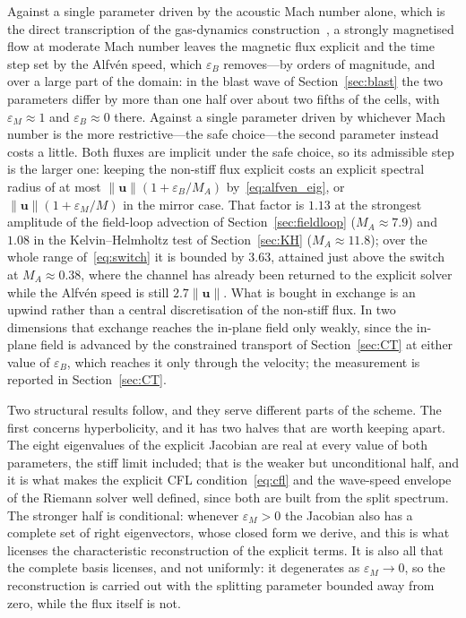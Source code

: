 \documentclass[a4paper,fleqn]{cas-sc}
\theoremstyle{remark}
\newcommand{\eps}{\varepsilon}
\newcommand{\epsM}{\eps_{M}}
\newcommand{\epsB}{\eps_{B}}
\begin{document}
Against a single parameter driven by the acoustic Mach number alone, which is
the direct transcription of the gas-dynamics
construction~\cite{DegondTang2011,IampietroEtAl2018}, a strongly magnetised
flow at moderate Mach number leaves the magnetic flux explicit and the time
step set by the Alfv\'en speed, which $\epsB$ removes---by orders of
magnitude, and over a large part of the domain: in the blast wave of
Section~\ref{sec:blast} the two parameters differ by more than one half over
about two fifths of the cells, with $\epsM\approx1$ and $\epsB\approx0$
there. Against a single parameter driven by whichever Mach number is the more
restrictive---the safe choice---the second parameter instead costs a little.
Both fluxes are implicit under the safe choice, so its admissible step is the
larger one: keeping the non-stiff flux explicit costs an explicit spectral
radius of at most $\|\mathbf u\|(1+\epsB/M_A)$ by~\eqref{eq:alfven_eig}, or
$\|\mathbf u\|(1+\epsM/M)$ in the mirror case. That factor is $1.13$ at the
strongest amplitude of the field-loop advection of Section~\ref{sec:fieldloop}
($M_A\approx7.9$) and $1.08$ in the Kelvin--Helmholtz test of
Section~\ref{sec:KH} ($M_A\approx11.8$); over the whole range
of~\eqref{eq:switch} it is bounded by $3.63$, attained just above the switch at
$M_A\approx0.38$, where the channel has already been returned to the explicit
solver while the Alfv\'en speed is still $2.7\|\mathbf u\|$. What is bought in
exchange is an upwind rather than a central discretisation of the non-stiff
flux. In two dimensions that exchange reaches the in-plane field only weakly,
since the in-plane field is advanced by the constrained transport of
Section~\ref{sec:CT} at either value of $\epsB$, which reaches it only through
the velocity; the measurement is reported in Section~\ref{sec:CT}.

Two structural results follow, and they serve different parts of the scheme.
The first concerns hyperbolicity, and it has two halves that are worth keeping
apart. The eight eigenvalues of the explicit Jacobian are real at every value
of both parameters, the stiff limit included; that is the weaker but
unconditional half, and it is what makes the explicit CFL
condition~\eqref{eq:cfl} and the wave-speed envelope of the Riemann solver well
defined, since both are built from the split spectrum. The stronger half is
conditional: whenever $\epsM>0$ the Jacobian also has a complete set of right
eigenvectors, whose closed form we derive, and this is what licenses the
characteristic reconstruction of the explicit terms. It is also all that the
complete basis licenses, and not uniformly: it degenerates as $\epsM\to0$, so
the reconstruction is carried out with the splitting parameter bounded away
from zero, while the flux itself is not.
\end{document}
